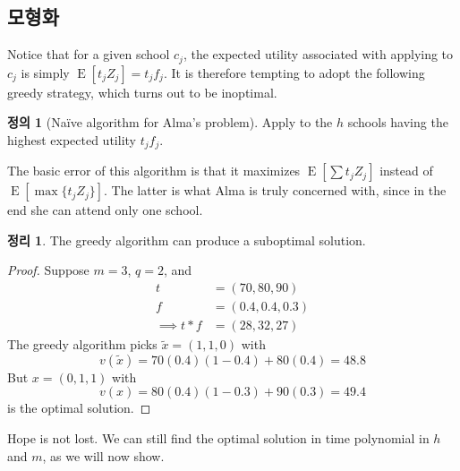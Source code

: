 \documentclass[12pt]{article} %
\newif\ifEN
\newtheorem{theorem}{Theorem}
\theoremstyle{definition}
\newtheorem{definition}{Definition}
\newtheorem{theorem}{정리}
\theoremstyle{definition}
\newtheorem{definition}{정의}
\begin{document}
\ifEN \subsection{Na\"ive solution}  \else \subsection{모형화} \fi
Notice that for a given school $c_j$, the expected utility associated with applying to $c_j$ is simply $\operatorname{E}[t_j Z_j] = t_j f_j$. It is therefore tempting to adopt the following greedy strategy, which turns out to be inoptimal.
\begin{definition}[Na\"ive algorithm for Alma’s problem] \label{naivealgorithm}
Apply to the $h$ schools having the highest expected utility $t_j f_j$.
\end{definition}
The basic error of this algorithm is that it maximizes $\operatorname{E}\left[\sum t_j Z_j \right]$ instead of $\operatorname{E}\left[\max \{t_j Z_j\} \right]$. The latter is what Alma is truly concerned with, since in the end she can attend only one school.
\begin{theorem}
The greedy algorithm can produce a suboptimal solution.
\end{theorem}
\begin{proof}
Suppose $m=3$, $q=2$, and
\begin{align*}
t &= (70, 80, 90) \\
f &= (0.4, 0.4, 0.3) \\
\implies t * f &= (28, 32, 27)
\end{align*}
The greedy algorithm picks $\tilde x = (1, 1, 0)$ with 
\[v(\tilde x) = 70(0.4)(1-0.4) + 80(0.4) = 48.8\]
But $x = (0, 1, 1)$ with
\[v(x) = 80(0.4)(1-0.3) + 90(0.3) = 49.4\]
is the optimal solution.
\end{proof}
Hope is not lost. We can still find the optimal solution in time polynomial in $h$ and $m$, as we will now show.
\end{document}
